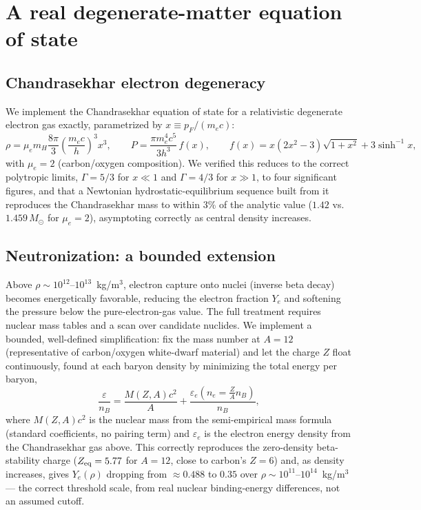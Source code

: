 \documentclass[11pt]{article}
\begin{document}
\section{A real degenerate-matter equation of state}
\label{sec:eos}

\subsection{Chandrasekhar electron degeneracy}

We implement the Chandrasekhar equation of state \citep{Chandrasekhar1935} for a relativistic degenerate electron gas exactly, parametrized by $x\equiv p_F/(m_ec)$:
\begin{equation}
\rho = \mu_e m_H \frac{8\pi}{3}\left(\frac{m_ec}{h}\right)^3 x^3, \qquad
P = \frac{\pi m_e^4c^5}{3h^3}\,f(x), \qquad
f(x) = x(2x^2-3)\sqrt{1+x^2}+3\sinh^{-1}x,
\end{equation}
with $\mu_e=2$ (carbon/oxygen composition). We verified this reduces to the correct polytropic limits, $\Gamma=5/3$ for $x\ll1$ and $\Gamma=4/3$ for $x\gg1$, to four significant figures, and that a Newtonian hydrostatic-equilibrium sequence built from it reproduces the Chandrasekhar mass to within 3\% of the analytic value ($1.42$ vs.\ $1.459\,M_\odot$ for $\mu_e=2$), asymptoting correctly as central density increases.

\subsection{Neutronization: a bounded extension}
\label{sec:neutronization}

Above $\rho\sim10^{12}$--$10^{13}$~kg/m$^3$, electron capture onto nuclei (inverse beta decay) becomes energetically favorable, reducing the electron fraction $Y_e$ and softening the pressure below the pure-electron-gas value. The full treatment \citep{BPS1971} requires nuclear mass tables and a scan over candidate nuclides. We implement a bounded, well-defined simplification: fix the mass number at $A=12$ (representative of carbon/oxygen white-dwarf material) and let the charge $Z$ float continuously, found at each baryon density by minimizing the total energy per baryon,
\begin{equation}
\frac{\varepsilon}{n_B} = \frac{M(Z,A)c^2}{A} + \frac{\varepsilon_e(n_e=\tfrac{Z}{A}n_B)}{n_B},
\end{equation}
where $M(Z,A)c^2$ is the nuclear mass from the semi-empirical mass formula (standard coefficients, no pairing term) and $\varepsilon_e$ is the electron energy density from the Chandrasekhar gas above. This correctly reproduces the zero-density beta-stability charge ($Z_{\rm eq}=5.77$ for $A=12$, close to carbon's $Z=6$) and, as density increases, gives $Y_e(\rho)$ dropping from $\approx0.488$ to $0.35$ over $\rho\sim10^{11}$--$10^{14}$~kg/m$^3$ --- the correct threshold scale, from real nuclear binding-energy differences, not an assumed cutoff.
\end{document}
